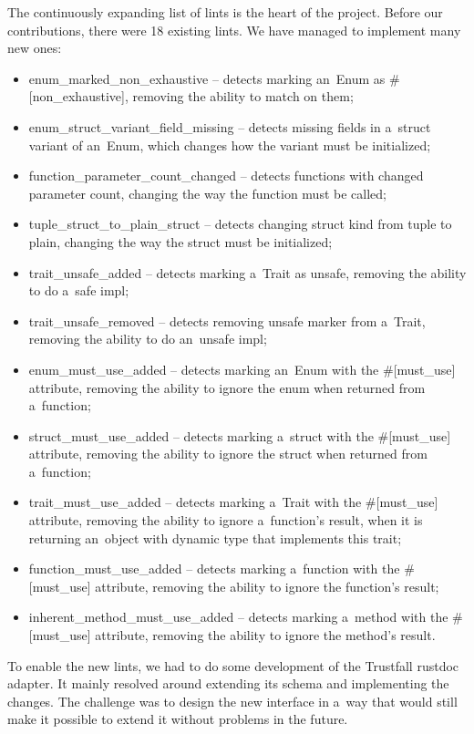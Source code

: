\documentclass[licencjacka,en]{pracamgr}
\begin{document}
The continuously expanding list of lints is the heart of the project.
Before our contributions, there were 18 existing lints.
We have managed to implement many new ones:
\begin{itemize}
    \item {\ttfamily enum\_marked\_non\_exhaustive}
        -- detects marking an~{\ttfamily Enum} as {\ttfamily \#[non\_exhaustive]},
		removing the ability to match on them;
    \item {\ttfamily enum\_struct\_variant\_field\_missing}
        -- detects missing fields in a~struct variant of an~{\ttfamily Enum},
        which changes how the variant must be initialized;
    \item {\ttfamily function\_parameter\_count\_changed}
        -- detects functions with changed parameter count,
        changing the way the function must be called;
    \item {\ttfamily tuple\_struct\_to\_plain\_struct}
        -- detects changing struct kind from tuple to plain,
        changing the way the struct must be initialized;
    \item {\ttfamily trait\_unsafe\_added}
        -- detects marking a~{\ttfamily Trait} as {\ttfamily unsafe},
        removing the ability to do a~safe {\ttfamily impl};
    \item {\ttfamily trait\_unsafe\_removed}
        -- detects removing {\ttfamily unsafe} marker from a~{\ttfamily Trait},
        removing the ability to do an~unsafe {\ttfamily impl};
    \item {\ttfamily enum\_must\_use\_added}
        -- detects marking an~{\ttfamily Enum} with the {\ttfamily \#[must\_use]} attribute,
        removing the ability to ignore the enum when returned from a~function;
    \item {\ttfamily struct\_must\_use\_added}
        -- detects marking a~struct with the {\ttfamily \#[must\_use]} attribute,
        removing the ability to ignore the struct when returned from a~function;
    \item {\ttfamily trait\_must\_use\_added}
        -- detects marking a~{\ttfamily Trait} with the {\ttfamily \#[must\_use]} attribute,
        removing the ability to ignore a~function's result, when it is returning an~object
        with dynamic type that implements this trait;
    \item {\ttfamily function\_must\_use\_added}
        -- detects marking a~function with the {\ttfamily \#[must\_use]} attribute,
        removing the ability to ignore the function's result;
    \item {\ttfamily inherent\_method\_must\_use\_added}
        -- detects marking a~method with the {\ttfamily \#[must\_use]} attribute,
        removing the ability to ignore the method's result.
\end{itemize}
To enable the new lints, we had to do some development of the Trustfall rustdoc adapter.
It mainly resolved around extending its schema and implementing the changes.
The challenge was to design the new interface in a~way that would
still make it possible to extend it without problems in the future.
\end{document}
